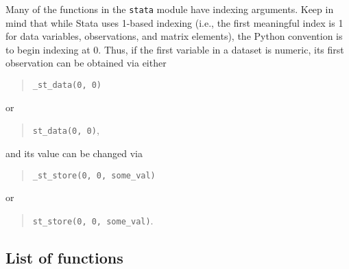 \documentclass{article}
\begin{document}
Many of the functions in the \lstinline$stata$ module have indexing arguments. Keep in mind that while Stata uses 1-based indexing (i.e., the first meaningful index is 1 for data variables, observations, and matrix elements), the Python convention is to begin indexing at 0. Thus, if the first variable in a dataset is numeric, its first observation can be obtained via either 
	\begin{quote}
		\lstinline$_st_data(0, 0)$
	\end{quote}
	or
	\begin{quote}
		\lstinline$st_data(0, 0)$,
	\end{quote}
	and its value can be changed via
	\begin{quote}
		\lstinline$_st_store(0, 0, some_val)$
	\end{quote}
	or
	\begin{quote}
		\lstinline$st_store(0, 0, some_val)$.
	\end{quote}


\subsection{List of functions} \label{stata_func_list}
\end{document}
